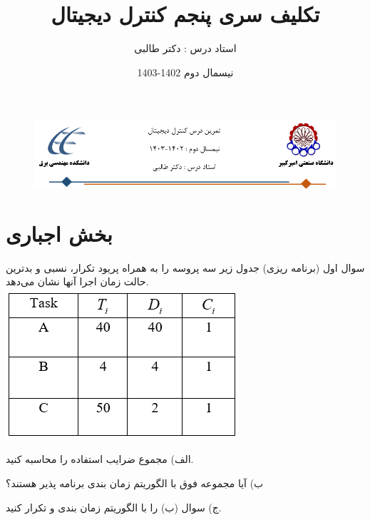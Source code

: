 \documentclass[12pt]{article}
\title{تکلیف سری پنجم کنترل دیجیتال}
\date{نیسمال دوم 1402-1403}
\author{استاد درس : دکتر طالبی}
\begin{document}
\markboth{\theauthor}{\thetitle}



\begin{figure}[htbp]
    \centering
    \includegraphics[width=\linewidth]{Header.png}
\end{figure}


\section{بخش اجباری}
    \begin{problem}{سوال اول}
    	(برنامه ریزی) جدول زیر سه پروسه را به همراه پریود تکرار، 
    	نسبی و بدترین حالت زمان اجرا آنها نشان می‌دهد.
    	\centering
    	\includegraphics[scale=1]{Resources/1.png}
    	
    	\raggedright
    	الف) مجموع ضرایب استفاده  را محاسبه کنید.
    	
    	ب) آیا مجموعه  فوق با الگوریتم زمان بندی  برنامه پذیر هستند؟
    	
    	ج) سوال (ب) را با الگوریتم زمان بندی 
    	و
    	تکرار کنید.

    \end{problem}
    
\end{document}
